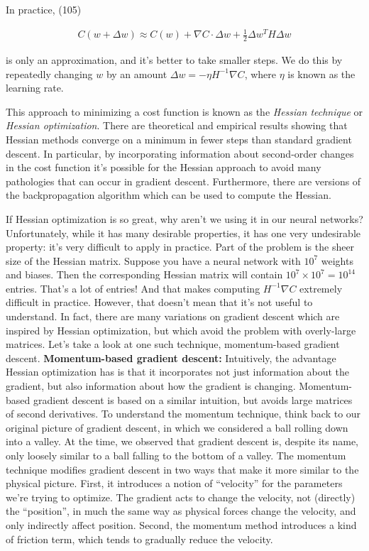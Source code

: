 In practice, (105)

\begin{align*}
C(w+\Delta w) \approx C(w) + \nabla C \cdot \Delta w + \frac{1}{2} \Delta w^T H \Delta w \nonumber
\end{align*}

\noindent is only an approximation, and it's better to take smaller steps. We do this by repeatedly changing $w$ by an amount $\Delta w = -\eta H^{-1} \nabla C$, where $\eta$ is known as the learning rate.


This approach to minimizing a cost function is known as the \emph{Hessian technique} or \emph{Hessian optimization}. There are theoretical and empirical results showing that Hessian methods converge on a minimum in fewer steps than standard gradient descent. In particular, by incorporating information about second-order changes in the cost function it's possible for the Hessian approach to avoid many pathologies that can occur in gradient descent. Furthermore, there are versions of the backpropagation algorithm which can be used to compute the Hessian.


If Hessian optimization is so great, why aren't we using it in our neural networks? Unfortunately, while it has many desirable properties, it has one very undesirable property: it's very difficult to apply in practice. Part of the problem is the sheer size of the Hessian matrix. Suppose you have a neural network with $10^7$ weights and biases. Then the corresponding Hessian matrix will contain $10^7 \times 10^7 = 10^{14}$ entries. That's a lot of entries! And that makes computing $H^{-1} \nabla C$ extremely difficult in practice. However, that doesn't mean that it's not useful to understand. In fact, there are many variations on gradient descent which are inspired by Hessian optimization, but which avoid the problem with overly-large matrices. Let's take a look at one such technique, momentum-based gradient descent. \textbf{Momentum-based gradient descent:} Intuitively, the advantage Hessian optimization has is that it incorporates not just information about the gradient, but also information about how the gradient is changing. Momentum-based gradient descent is based on a similar intuition, but avoids large matrices of second derivatives. To understand the momentum technique, think back to our original picture of gradient descent, in which we considered a ball rolling down into a valley. At the time, we observed that gradient descent is, despite its name, only loosely similar to a ball falling to the bottom of a valley. The momentum technique modifies gradient descent in two ways that make it more similar to the physical picture. First, it introduces a notion of ``velocity'' for the parameters we're trying to optimize. The gradient acts to change the velocity, not (directly) the ``position'', in much the same way as physical forces change the velocity, and only indirectly affect position. Second, the momentum method introduces a kind of friction term, which tends to gradually reduce the velocity.


